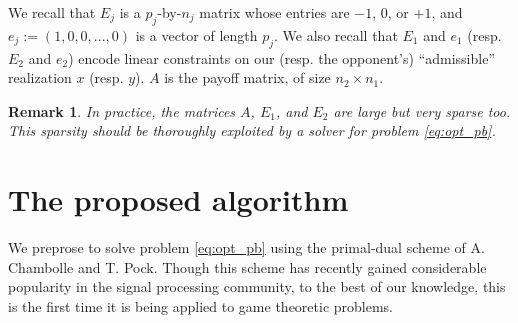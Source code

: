\documentclass[a4paper,9pt,journal]{IEEEtran}
\newtheorem{remark}{Remark}
\begin{document}
We recall that $E_j$ is a $p_j$-by-$n_j$ matrix whose
entries are $-1$, $0$, or $+1$, and $e_j := (1, 0, 0, ..., 0)$ is a vector of length $p_j$. We also recall that $E_1$ and $e_1$ (resp. $E_2$ and $e_2$)
encode linear constraints on our (resp. the opponent's)  ``admissible'' realization $x$ (resp. $y$). $A$ is the payoff matrix, of size $n_2 \times n_1$.


\begin{remark}
  In practice, the matrices $A$, $E_1$, and $E_2$ are large but very sparse too.
This sparsity should be thoroughly exploited by a solver for problem \eqref{eq:opt_pb}.
\end{remark}




\section{The proposed algorithm}
We preprose to solve problem \eqref{eq:opt_pb} using the primal-dual scheme of A. Chambolle and T. Pock.
Though this scheme has recently gained considerable popularity in the signal processing community, to the best of our knowledge,
this is the first time it is being applied to game theoretic problems.

\end{document}
